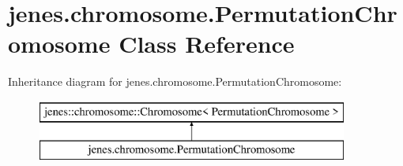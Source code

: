 \hypertarget{classjenes_1_1chromosome_1_1_permutation_chromosome}{\section{jenes.\-chromosome.\-Permutation\-Chromosome Class Reference}
\label{classjenes_1_1chromosome_1_1_permutation_chromosome}
}
Inheritance diagram for jenes.\-chromosome.\-Permutation\-Chromosome\-:\begin{figure}[H]
\begin{center}
\leavevmode
\includegraphics[height=2.000000cm]{classjenes_1_1chromosome_1_1_permutation_chromosome}
\end{center}
\end{figure}
